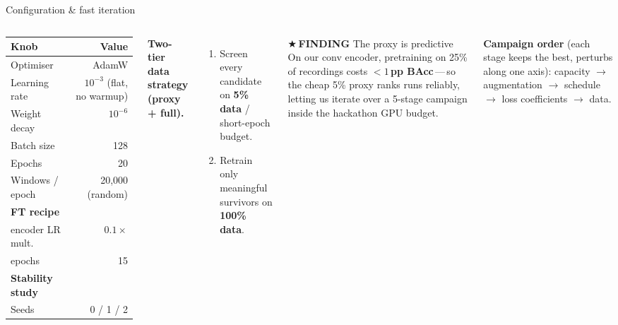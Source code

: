 \documentclass[aspectratio=169,11pt]{beamer}
\newcommand{\findingtag}{\textcolor{tplgold}{\scriptsize\sffamily\bfseries$\bigstar$\,FINDING}\xspace}
\newcommand{\sectionheader}[1]{\renewcommand{\insertsection}{#1}}
\begin{document}
\sectionheader{TRAINING SETUP \& ITERATION}
\begin{frame}{Configuration \& fast iteration}
\begin{columns}[T,onlytextwidth]
\centering\small
\begin{tabular}{@{}lr@{}}
\toprule
\textbf{Knob} & \textbf{Value} \\
\midrule
Optimiser     & AdamW \\
Learning rate & $10^{-3}$ (flat, no warmup) \\
Weight decay  & $10^{-6}$ \\
Batch size    & 128 \\
Epochs        & 20 \\
Windows / epoch & 20{,}000 (random) \\
\midrule
\textbf{FT recipe} & \\
\quad encoder LR mult.   & $0.1\times$ \\
\quad epochs             & 15 \\
\midrule
\textbf{Stability study} & \\
\quad Seeds                 & 0 / 1 / 2 \\
\bottomrule
\end{tabular}

\textbf{Two-tier data strategy (proxy + full).}
\begin{enumerate}\setlength\itemsep{0pt}
\item Screen every candidate on \textbf{5\% data} / short-epoch budget.
\item Retrain only meaningful survivors on \textbf{100\% data}.
\end{enumerate}

\vspace{0.4em}
\begin{findingbox}\findingtag The proxy is predictive\\[0.2em]
\small On our conv encoder, pretraining on 25\% of recordings costs
\textbf{$<1$\,pp BAcc}\,---\,so the cheap 5\% proxy ranks runs reliably,
letting us iterate over a 5-stage campaign inside the hackathon GPU budget.
\end{findingbox}

\vspace{0.4em}
\textbf{Campaign order} (each stage keeps the best, perturbs along one axis):
capacity $\to$ augmentation $\to$ schedule $\to$ loss coefficients $\to$ data.
\end{columns}
\end{frame}
\end{document}
